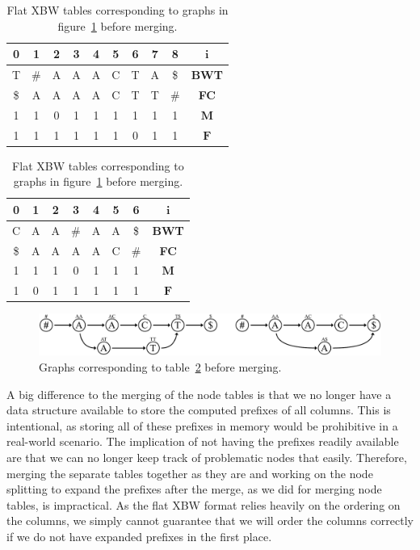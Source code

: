 \documentclass[a4paper,12pt,twoside,BCOR=10mm]{scrbook}
\begin{document}
\begin{table}[htb]
\centering
\caption[Flat XBW tables before merging]{Flat XBW tables corresponding to graphs in figure~\ref{fig:evo_fig_flat_merge_step_zero} before merging.}
{
\renewcommand{\tabcolsep}{5pt}
\begin{tabular}{ | c | c | c | c | c | c | c | c | c | c | }
\hline
0 & 1 & 2 & 3 & 4 & 5 & 6 & 7 & 8 & $\boldsymbol{i}$ \\ \hline
T & $\#$ & A & A & A & C & T & A & \$ & \textbf{BWT} \\ \hline
\$ & A & A & A & A & C & T & T & $\#$ & \textbf{FC} \\ \hline
1 & 1 & 0 & 1 & 1 & 1 & 1 & 1 & 1 & $\boldsymbol{M}$ \\ \hline
1 & 1 & 1 & 1 & 1 & 1 & 0 & 1 & 1 & $\boldsymbol{F}$ \\ \hline
\end{tabular}
\quad
\begin{tabular}{ | c | c | c | c | c | c | c | c | }
\hline
0 & 1 & 2 & 3 & 4 & 5 & 6 & $\boldsymbol{i}$ \\ \hline
C & A & A & $\#$ & A & A & \$ & \textbf{BWT} \\ \hline
\$ & A & A & A & A & C & $\#$ & \textbf{FC} \\ \hline
1 & 1 & 1 & 0 & 1 & 1 & 1 & $\boldsymbol{M}$ \\ \hline
1 & 0 & 1 & 1 & 1 & 1 & 1 & $\boldsymbol{F}$ \\ \hline
\end{tabular}
}
\label{table:evo_fig_flat_merge_step_zero}
\end{table}
\begin{figure}[!htb]
\centering
\includegraphics[width=\textwidth]{evo_fig_flat_merge_step_zero.pdf}
\caption[Graphs before merging]{Graphs corresponding to table~\ref{table:evo_fig_flat_merge_step_zero} before merging.} \label{fig:evo_fig_flat_merge_step_zero}
\end{figure}

A big difference to the merging of the node tables is that we no longer have
a data structure available to store the computed prefixes of all columns.
This is intentional, as storing all of these prefixes in memory would be prohibitive
in a real-world scenario. The implication of not having the prefixes readily available
are that we can no longer keep track of problematic nodes that easily.
Therefore, merging the separate tables together as they are and working on the node splitting to expand the prefixes
after the merge, as we did for merging node tables, is impractical.
As the flat XBW format relies heavily on the ordering on the columns,
we simply cannot guarantee that we will order the columns correctly
if we do not have expanded prefixes in the first place.
\end{document}
